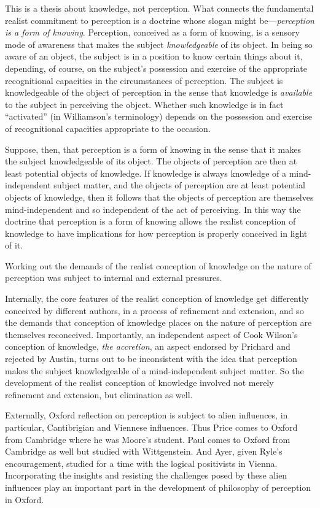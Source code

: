 This is a thesis about knowledge, not perception. What connects the fundamental realist commitment to perception is a doctrine whose slogan might be---\emph{perception is a form of knowing}. Perception, conceived as a form of knowing, is a sensory mode of awareness that makes the subject \emph{knowledgeable} of its object. In being so aware of an object, the subject is in a position to know certain things about it, depending, of course, on the subject's possession and exercise of the appropriate recognitional capacities in the circumstances of perception. The subject is knowledgeable of the object of perception in the sense that knowledge is \emph{available} to the subject in perceiving the object. Whether such knowledge is in fact ``activated'' (in Williamson's \citeyear{Williamson:1990uq} terminology) depends on the possession and exercise of recognitional capacities appropriate to the occasion.

Suppose, then, that perception is a form of knowing in the sense that it makes the subject knowledgeable of its object. The objects of perception are then at least potential objects of knowledge. If knowledge is always knowledge of a mind-independent subject matter, and the objects of perception are at least potential objects of knowledge, then it follows that the objects of perception are themselves mind-independent and so independent of the act of perceiving. In this way the doctrine that perception is a form of knowing allows the realist conception of knowledge to have implications for how perception is properly conceived in light of it.

Working out the demands of the realist conception of knowledge on the nature of perception was subject to internal and external pressures. 

Internally, the core features of the realist conception of knowledge get differently conceived by different authors, in a process of refinement and extension, and so the demands that conception of knowledge places on the nature of perception are themselves reconceived. Importantly, an independent aspect of Cook Wilson's conception of knowledge, \emph{the accretion}, an aspect endorsed by Prichard and rejected by Austin, turns out to be inconsistent with the idea that perception makes the subject knowledgeable of a mind-independent subject matter. So the development of the realist conception of knowledge involved not merely refinement and extension, but elimination as well.

Externally, Oxford reflection on perception is subject to alien influences, in particular, Cantibrigian and Viennese influences. Thus Price comes to Oxford from Cambridge where he was Moore's student. Paul comes to Oxford from Cambridge as well but studied with Wittgenstein. And Ayer, given Ryle's encouragement, studied for a time with the logical positivists in Vienna. Incorporating the insights and resisting the challenges posed by these alien influences play an important part in the development of philosophy of perception in Oxford.

